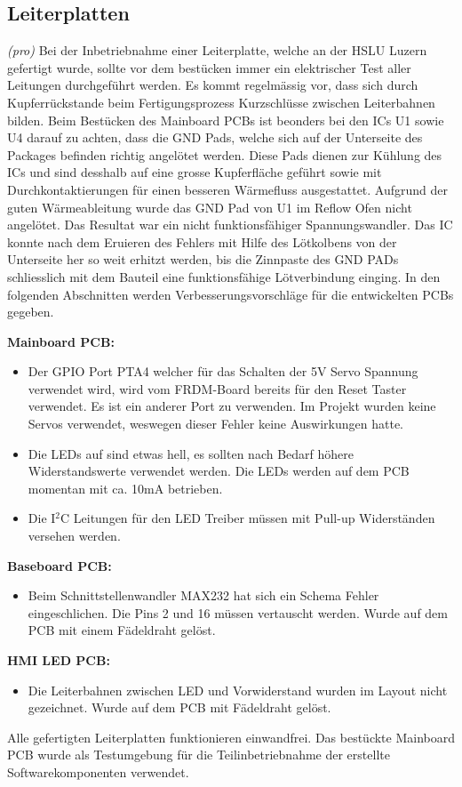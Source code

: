 \subsection{Leiterplatten}
\textit{(pro)} Bei der Inbetriebnahme einer Leiterplatte, welche an der HSLU Luzern gefertigt wurde, sollte vor dem bestücken immer ein elektrischer Test aller Leitungen durchgeführt werden. Es kommt regelmässig vor, dass sich durch Kupferrückstande beim Fertigungsprozess Kurzschlüsse zwischen Leiterbahnen bilden. Beim Bestücken des Mainboard PCBs ist beonders bei den ICs U1 sowie U4 darauf zu achten, dass die GND Pads, welche sich auf der Unterseite des Packages befinden richtig angelötet werden. Diese Pads dienen zur Kühlung des ICs und sind desshalb auf eine grosse Kupferfläche geführt sowie mit Durchkontaktierungen für einen besseren Wärmefluss ausgestattet. Aufgrund der guten Wärmeableitung wurde das GND Pad von U1 im Reflow Ofen nicht angelötet. Das Resultat war ein nicht funktionsfähiger Spannungswandler. Das IC konnte nach dem Eruieren des Fehlers mit Hilfe des Lötkolbens von der Unterseite her so weit erhitzt werden, bis die Zinnpaste des GND PADs schliesslich mit dem Bauteil eine funktionsfähige Lötverbindung einging. In den folgenden Abschnitten werden Verbesserungsvorschläge für die entwickelten PCBs gegeben.
\newline

\textbf{Mainboard PCB:}
\begin{itemize}
	\item Der GPIO Port PTA4 welcher für das Schalten der 5V Servo Spannung verwendet wird, wird vom FRDM-Board bereits für den Reset Taster verwendet. Es ist ein anderer Port zu verwenden. Im Projekt wurden keine Servos verwendet, weswegen dieser Fehler keine Auswirkungen hatte.
	\item Die LEDs auf sind etwas hell, es sollten nach Bedarf höhere Widerstandswerte verwendet werden. Die LEDs werden auf dem PCB momentan mit ca. 10mA betrieben.
	\item Die I$^{2}$C Leitungen für den LED Treiber müssen mit Pull-up Widerständen versehen werden.
\end{itemize}

\textbf{Baseboard PCB:}
\begin{itemize}
	\item Beim Schnittstellenwandler MAX232 hat sich ein Schema Fehler eingeschlichen. Die Pins 2 und 16 müssen vertauscht werden. Wurde auf dem PCB mit einem Fädeldraht gelöst.
\end{itemize}

\textbf{HMI LED PCB:}
\begin{itemize}
	\item Die Leiterbahnen zwischen LED und Vorwiderstand wurden im Layout nicht gezeichnet. Wurde auf dem PCB mit Fädeldraht gelöst.
\end{itemize}

Alle gefertigten Leiterplatten funktionieren einwandfrei. Das bestückte Mainboard PCB wurde als Testumgebung für die Teilinbetriebnahme der erstellte Softwarekomponenten verwendet.